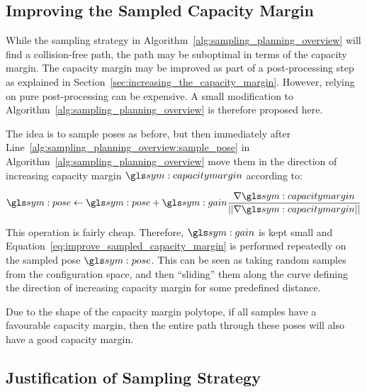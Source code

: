 	\subsection{Improving the Sampled Capacity Margin}%
	\label{sec:improving_the_sampled_capacity_margin}


		While the sampling strategy in
		Algorithm~\ref{alg:sampling_planning_overview} will find a
		collision-free path, the path may be suboptimal in terms of the capacity
		margin. The capacity margin may be improved as part of a post-processing
		step as explained in Section~\ref{sec:increasing_the_capacity_margin}.
		However, relying on pure post-processing can be expensive. A small
		modification to Algorithm~\ref{alg:sampling_planning_overview} is
		therefore proposed here.

		The idea is to sample poses as before, but then immediately after
		Line~\ref{alg:sampling_planning_overview:sample_pose} in
		Algorithm~\ref{alg:sampling_planning_overview} move them in the
		direction of increasing capacity margin $\capacitymargin$ according to:

		\begin{equation}
			\pose \gets \pose +
				\gain\frac
				{%
					\nabla\capacitymargin
				}
				{%
					\norm
					{%
						\nabla\capacitymargin
					}
				}
			\label{eq:improve_sampled_capacity_margin}
		\end{equation}

		This operation is fairly cheap. Therefore, $\gain$ is kept small and
		Equation~\ref{eq:improve_sampled_capacity_margin} is performed
		repeatedly on the sampled pose $\pose$. This can be seen as taking
		random samples from the configuration space, and then ``sliding'' them
		along the curve defining the direction of increasing capacity margin for
		some predefined distance.

		Due to the shape of the capacity margin polytope, if all samples have a
		favourable capacity margin, then the entire path through these poses
		will also have a good capacity margin.

	\subsection{Justification of Sampling Strategy}%
	\label{sec:justification_of_sampling_strategy}

